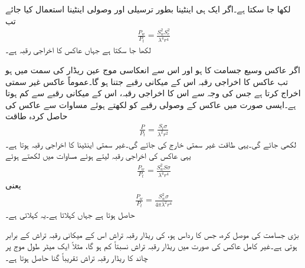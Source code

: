 لکھا جا سکتا ہے۔اگر ایک ہی اینٹینا بطور ترسیلی اور وصولی اینٹینا استعمال کیا جائے تب
\begin{align}\label{مساوات_اینٹینا_فرائس_الف}
\frac{P_w}{P_t}=\frac{S_w^2 S_e^2}{\lambda^4 r^4}
\end{align}
لکھا جا سکتا ہے جہاں عاکس کا اخراجی رقبہ  ہے۔

اگر عاکس وسیع جسامت کا ہو اور اس سے انعکاسی موج عین ریڈار کی سمت میں ہو تب عاکس کا اخراجی رقبہ اس کے میکانی رقبے جتنا ہو گا۔عموماً عاکس غیر سمتی اخراج کرتا ہے جس کی وجہ سے اس کا اخراجی رقبہ، اس کے میکانی رقبے سے کم ہوتا ہے۔ایسی صورت میں عاکس کے وصولی رقبے کو  لکھتے ہوئے مساوات  سے عاکس کی حاصل کردہ طاقت
\begin{align}
\frac{P}{P_t}=\frac{S_t \sigma}{\lambda^2 r^2}
\end{align}
لکھی جائے گی۔یہی طاقت غیر سمتی خارج کی جائے گی۔غیر سمتی اینٹینا کا اخراجی رقبہ  ہوتا ہے۔یہی عاکس کی اخراجی رقبہ لیتے ہوئے مساوات  میں  لکھتے ہوئے
\begin{align}
\frac{P_w}{P_t}=\frac{S_w^2 S \sigma}{\lambda^4 r^4}
\end{align}
یعنی
\begin{align}
\frac{P_w}{P_t}=\frac{S_w^2 \sigma}{4\pi \lambda^2 r^4}
\end{align}
حاصل ہوتا ہے جہاں   کہلاتا ہے۔یہ  کہلاتی ہے۔  

بڑی جسامت کی موصل کرہ، جس کا رداس  ہو،  کی ریڈار رقبہ تراش اس کے میکانی رقبہ تراش  کے برابر ہوتی ہے۔غیر کامل عاکس کی صورت میں ریڈار رقبہ تراش نسبتاً کم ہو گا، مثلاً ایک میٹر طول موج پر چاند کا ریڈار رقبہ تراش تقریباً  گنا حاصل ہوتا ہے۔ 

